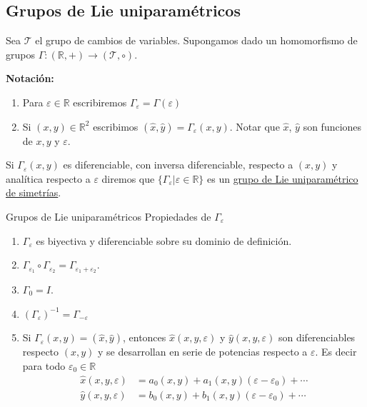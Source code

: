 \documentclass{article}
\newcommand{\rr}{\mathbb{R}}
\renewcommand{\emph}[1]{\textcolor[rgb]{1,0,0}{#1}}
\renewcommand{\epsilon}{\varepsilon}
\begin{document}
\subsection{Grupos de Lie uniparamétricos}

Sea $\mathscr{T}$ el grupo de cambios de variables. Supongamos dado un homomorfismo de grupos $\Gamma:(\rr,+)\to (\mathscr{T},\circ)$.  

\textbf{Notación:}
\begin{enumerate}
\item Para $\epsilon\in\rr$ escribiremos $\Gamma_{\epsilon}=\Gamma(\epsilon)$
\item<+> Si $(x,y)\in\rr^2$ escribimos $(\hat{x},\hat{y})=\Gamma_{\epsilon}(x,y)$. Notar que $\hat{x}$, $\hat{y}$ son funciones de $x,y$ y $\epsilon$.
\end{enumerate}
 Si $\Gamma_{\epsilon}(x,y)$ es diferenciable, con inversa diferenciable, respecto a $(x,y)$ y analítica respecto a $\epsilon$ diremos que $\{\Gamma_{\epsilon}|\epsilon\in\rr\}$ es un \href{http://es.wikipedia.org/wiki/Grupo_uniparamétrico}{\emph{grupo de Lie uniparamétrico de simetrías}}.










{Grupos de Lie uniparamétricos}
{Propiedades de $\Gamma_{\epsilon}$}
\begin{enumerate}
\item$\Gamma_{\epsilon}$ es biyectiva y diferenciable sobre su dominio de definición.
 \item $\Gamma_{\epsilon_1}\circ \Gamma_{\epsilon_2}=\Gamma_{\epsilon_1+\epsilon_2}$.

\item $\Gamma_0=I$.

\item $\left(\Gamma_{\epsilon}\right)^{-1}=\Gamma_{-\epsilon}$

\item Si $\Gamma_{\epsilon}(x,y)=(\hat{x},\hat{y})$, entonces  $\hat{x}(x,y,\epsilon)$ y $\hat{y}(x,y,\epsilon)$ son  diferenciables respecto $(x,y)$ y se desarrollan en serie de potencias respecto a $\epsilon$. Es decir para todo $\epsilon_0\in\rr$
\[
\begin{array}{cc}
\hat{x}(x,y,\epsilon)&=a_0(x,y)+a_1(x,y)(\epsilon- \epsilon_0)+\cdots\\
\hat{y}(x,y,\epsilon)&=b_0(x,y)+b_1(x,y)(\epsilon- \epsilon_0)+\cdots\\
\end{array}
\]

\end{enumerate}
\end{document}
